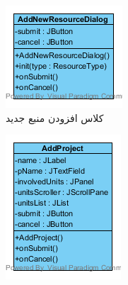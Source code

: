 \begin{figure}[H]
	\centering
	\begin{subfigure}[b]{0.2\textwidth}
		\includegraphics[width=\textwidth]{img/class-design/ui/AddNewResourceDialog.png}
		\caption{کلاس افزودن منبع جدید}
	\end{subfigure}
	\begin{subfigure}[b]{0.2\textwidth}
		\includegraphics[width=\textwidth]{img/class-design/ui/AddProject.png}

\end{subfigure}
\end{figure}
